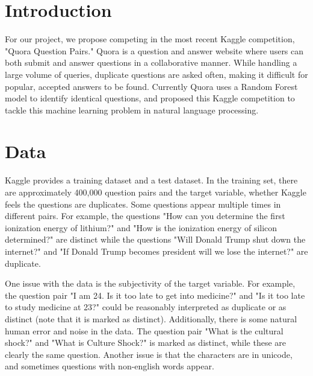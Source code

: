 \documentclass[12pt]{article}
\begin{document}
\maketitle




\section{Introduction}
For our project, we propose competing in the most recent Kaggle competition, "Quora Question Pairs." Quora is a question and answer website where users can both submit and answer questions in a collaborative manner. While handling a large volume of queries, duplicate questions are asked often, making it difficult for popular, accepted answers to be found. Currently Quora uses a Random Forest model to identify identical questions, and proposed this Kaggle competition to tackle this machine learning problem in natural language processing.

\section{Data}
Kaggle provides a training dataset and a test dataset. In the training set, there are approximately 400,000 question pairs and the target variable, whether Kaggle feels the questions are duplicates. Some questions appear multiple times in different pairs. For example, the questions "How can you determine the first ionization energy of lithium?" and "How is the ionization energy of silicon determined?" are distinct while the questions "Will Donald Trump shut down the internet?" and "If Donald Trump becomes president will we lose the internet?" are duplicate.

One issue with the data is the subjectivity of the target variable. For example, the question pair "I am 24. Is it too late to get into medicine?" and "Is it too late to study medicine at 23?" could be reasonably interpreted as duplicate or as distinct (note that it is marked as distinct). Additionally, there is some natural human error and noise in the data. The question pair "What is the cultural shock?" and "What is Culture Shock?" is marked as distinct, while these are clearly the same question. Another issue is that the characters are in unicode, and sometimes questions with non-english words appear.
\end{document}
